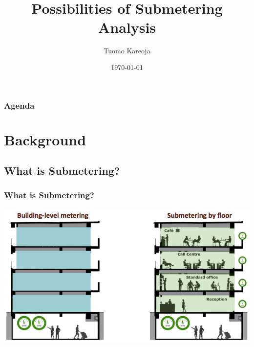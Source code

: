 \documentclass[10pt]{beamer}
\title[Data Science in Blackwell]{Possibilities of Submetering Analysis} %
\author{Tuomo Kareoja} %
\institute[IOT Analytics] %
{
IOT Analytics \\ %
\medskip
}
\date{\today} %
\begin{document}
\begin{frame}
\titlepage %
\end{frame}

\begin{frame}
\frametitle{Agenda} %
\tableofcontents %
\end{frame}


\section{Background}

\subsection{What is Submetering?}

\begin{frame}
\frametitle{What is Submetering?}

\bigskip
{
    \centering
    \includegraphics[width=\textwidth,height=\textheight,keepaspectratio]{submetering.png}
    \par
}
\bigskip

\end{frame}
\end{document}
